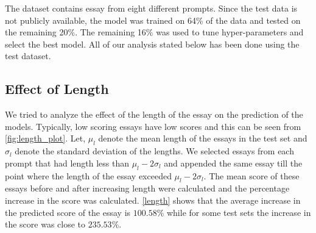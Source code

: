 \documentclass[11pt,a4paper]{article}
\begin{document}
The dataset contains essay from eight different prompts. Since the test data is not publicly available, the model was trained on 64\% of the data and tested on the remaining 20\%. The remaining 16\% was used to tune hyper-parameters and select the best model.
All of our analysis stated below has been done using the test dataset.

\subsection{Effect of Length}

We tried to analyze the effect of the length of the essay on the prediction of the models. Typically, low scoring essays have low scores and this can be seen from \cref{fig:length_plot}. Let, $\mu_l$ denote the mean length of the essays in the test set and $\sigma_l$ denote the standard deviation of the lengths. We selected essays from each prompt that had length less than $\mu_l - 2\sigma_l$ and appended the same essay till the point where the length of the essay exceeded $\mu_l - 2\sigma_l$. The mean score of these essays before and after increasing length were calculated and the percentage increase in the score was calculated. \ref{length} shows that the average increase in the predicted score of the essay is $100.58\%$ while for some test sets the increase in the score was close to $235.53\%$. 
\end{document}
